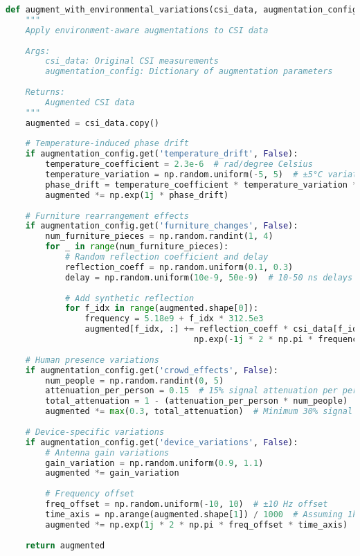\documentclass[journal]{IEEEtran}
\begin{document}
\begin{lstlisting}[language=Python, caption=Environment-Aware Data Augmentation]
def augment_with_environmental_variations(csi_data, augmentation_config):
    """
    Apply environment-aware augmentations to CSI data
    
    Args:
        csi_data: Original CSI measurements
        augmentation_config: Dictionary of augmentation parameters
    
    Returns:
        Augmented CSI data
    """
    augmented = csi_data.copy()
    
    # Temperature-induced phase drift
    if augmentation_config.get('temperature_drift', False):
        temperature_coefficient = 2.3e-6  # rad/degree Celsius
        temperature_variation = np.random.uniform(-5, 5)  # ±5°C variation
        phase_drift = temperature_coefficient * temperature_variation * np.arange(csi_data.shape[1])
        augmented *= np.exp(1j * phase_drift)
    
    # Furniture rearrangement effects
    if augmentation_config.get('furniture_changes', False):
        num_furniture_pieces = np.random.randint(1, 4)
        for _ in range(num_furniture_pieces):
            # Random reflection coefficient and delay
            reflection_coeff = np.random.uniform(0.1, 0.3)
            delay = np.random.uniform(10e-9, 50e-9)  # 10-50 ns delays
            
            # Add synthetic reflection
            for f_idx in range(augmented.shape[0]):
                frequency = 5.18e9 + f_idx * 312.5e3
                augmented[f_idx, :] += reflection_coeff * csi_data[f_idx, :] * \
                                      np.exp(-1j * 2 * np.pi * frequency * delay)
    
    # Human presence variations
    if augmentation_config.get('crowd_effects', False):
        num_people = np.random.randint(0, 5)
        attenuation_per_person = 0.15  # 15% signal attenuation per person
        total_attenuation = 1 - (attenuation_per_person * num_people)
        augmented *= max(0.3, total_attenuation)  # Minimum 30% signal strength
    
    # Device-specific variations
    if augmentation_config.get('device_variations', False):
        # Antenna gain variations
        gain_variation = np.random.uniform(0.9, 1.1)
        augmented *= gain_variation
        
        # Frequency offset
        freq_offset = np.random.uniform(-10, 10)  # ±10 Hz offset
        time_axis = np.arange(augmented.shape[1]) / 1000  # Assuming 1kHz sampling
        augmented *= np.exp(1j * 2 * np.pi * freq_offset * time_axis)
    
    return augmented
\end{lstlisting}
\end{document}
